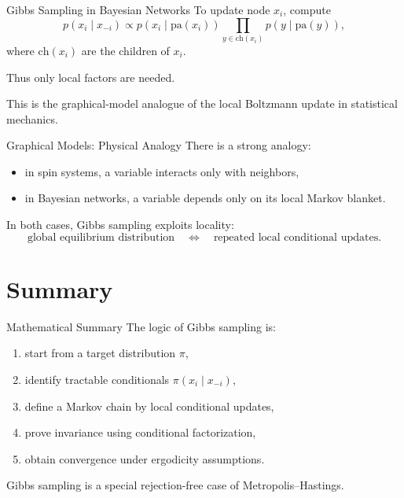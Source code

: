 \documentclass[aspectratio=169]{beamer}
\begin{document}
\begin{frame}{Gibbs Sampling in Bayesian Networks}
To update node \(x_i\), compute
\[
p(x_i\mid x_{-i})\propto p(x_i\mid \mathrm{pa}(x_i))
\prod_{y\in \mathrm{ch}(x_i)} p(y\mid \mathrm{pa}(y)),
\]
where \(\mathrm{ch}(x_i)\) are the children of \(x_i\).

Thus only local factors are needed.

This is the graphical-model analogue of the local Boltzmann update in statistical mechanics.
\end{frame}

\begin{frame}{Graphical Models: Physical Analogy}
There is a strong analogy:
\begin{itemize}
    \item in spin systems, a variable interacts only with neighbors,
    \item in Bayesian networks, a variable depends only on its local Markov blanket.
\end{itemize}

In both cases, Gibbs sampling exploits locality:
\[
\text{global equilibrium distribution}
\quad\Longleftrightarrow\quad
\text{repeated local conditional updates}.
\]
\end{frame}

\section{Summary}

\begin{frame}{Mathematical Summary}
The logic of Gibbs sampling is:
\begin{enumerate}
    \item start from a target distribution \(\pi\),
    \item identify tractable conditionals \(\pi(x_i\mid x_{-i})\),
    \item define a Markov chain by local conditional updates,
    \item prove invariance using conditional factorization,
    \item obtain convergence under ergodicity assumptions.
\end{enumerate}

Gibbs sampling is a special rejection-free case of Metropolis--Hastings.
\end{frame}
\end{document}
